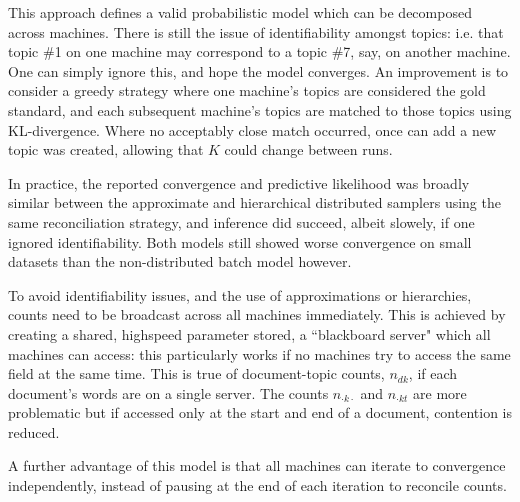 This approach defines a valid probabilistic model which can be decomposed across machines. There is still the issue of identifiability amongst topics: i.e. that topic \#1 on one machine may correspond to a topic \#7, say, on another machine. One can simply ignore this, and hope the model converges. An improvement is to consider a greedy strategy where one machine's topics are considered the gold standard, and each subsequent machine's topics are matched to those topics using KL-divergence. Where no acceptably close match occurred, once can add a new topic was created, allowing that $K$ could change between runs. 

In practice\cite{Newman2009}, the reported convergence and predictive likelihood was broadly similar between the approximate and hierarchical distributed samplers using the same reconciliation strategy, and inference did succeed, albeit slowely, if one ignored identifiability. Both models still showed worse convergence on small datasets than the non-distributed batch model however.

To avoid identifiability issues, and the use of approximations or hierarchies, counts need to be broadcast across all machines immediately. This is achieved by creating a shared, highspeed parameter stored, a ``blackboard server"\cite{Smola2010} which all machines can access: this particularly works if no machines try to access the same field at the same time. This is true of document-topic counts, $n_{dk}$, if each document's words are on a single server. The counts $n_{\cdot k \cdot}$ and $n_{\cdot k t}$ are more problematic but if accessed only at the start and end of a document, contention is reduced. 

A further advantage of this model is that all machines can iterate to convergence independently, instead of pausing at the end of each iteration to reconcile counts.

